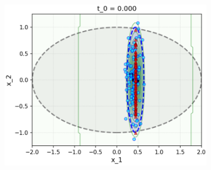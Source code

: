 \documentclass[../../book-main.tex]{subfiles}
\begin{document}
\begin{example}
\begin{figure}[tbp]
\begin{subfigure}{0.32\textwidth}
      \includegraphics[width=\linewidth]{figs_chap5/samples_step_100_t_0_smallnoise.png}
    \end{subfigure}


\end{figure}
\end{example}
\end{document}
